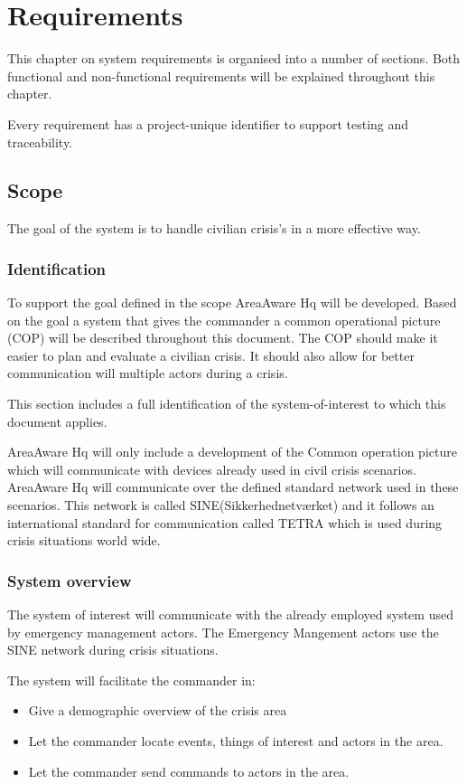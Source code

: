 \label{chp_requirements}
\chapter{Requirements}
This chapter on system requirements is organised into a number of sections. Both functional and non-functional requirements will be explained throughout this chapter.

Every requirement has a project-unique identifier to support testing and traceability.

\section{Scope}
The goal of the system is to handle civilian crisis's in a more effective way. 

\subsection{Identification}
To support the goal defined in the scope AreaAware Hq will be developed. Based on the goal a system that gives the commander a common operational picture (COP) will be described throughout this document. The COP should make it easier to plan and evaluate a civilian crisis. It should also allow for better communication will multiple actors during a crisis.

This section includes a full identification of the system-of-interest to which this document applies.

AreaAware Hq will only include a development of the Common operation picture which will communicate with devices already used in civil crisis scenarios. AreaAware Hq will communicate over the defined standard network used in these scenarios. This network is called SINE(Sikkerhednetværket) and it follows an international standard for communication called TETRA which is used during crisis situations world wide. 

\subsection{System overview}
The system of interest will communicate with the already employed system used by emergency management actors. The Emergency Mangement actors use the SINE network during crisis situations.

The system will facilitate the commander in:
\begin{itemize}
	\item Give a demographic overview of the crisis area
	\item Let the commander locate events, things of interest and actors in the area.
	\item Let the commander send commands to actors in the area.
\end{itemize}

